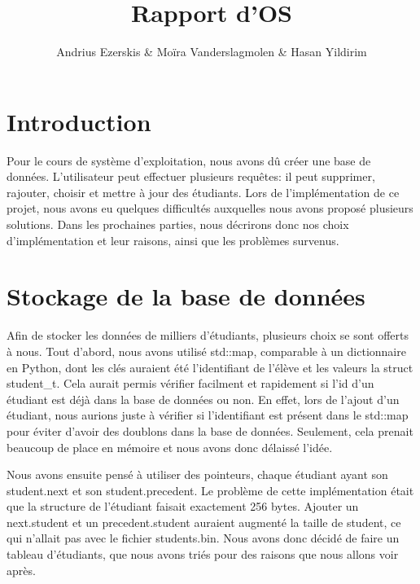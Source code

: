 \documentclass[utf8]{article}
\begin{document}
\begin{titlepage}
    

\author{Andrius Ezerskis \& Moïra Vanderslagmolen \& Hasan Yildirim}
\title{Rapport d'OS}

\maketitle
\end{titlepage}

\section{Introduction}
\par
Pour le cours de système d'exploitation, nous avons dû créer une base de données. 
L'utilisateur peut effectuer plusieurs requêtes: il peut supprimer, rajouter, choisir
et mettre à jour des étudiants. Lors de l'implémentation de ce projet, nous avons eu quelques difficultés
auxquelles nous avons proposé plusieurs solutions. Dans les prochaines parties, nous décrirons donc
nos choix d'implémentation et leur raisons, ainsi que les problèmes survenus.
\par


\section{Stockage de la base de données}
\indent{}
\par
Afin de stocker les données de milliers d'étudiants, plusieurs choix se sont offerts à nous. 
Tout d'abord, nous avons utilisé std::map, comparable à un dictionnaire en Python, dont les
clés auraient été l'identifiant de l'élève et les valeurs la struct student\_t. 
Cela aurait permis vérifier facilment et rapidement si l'id d'un étudiant est déjà dans la base de données ou non. En effet, lors de l'ajout d'un étudiant, nous aurions juste à vérifier si l'identifiant est présent dans le std::map pour éviter d'avoir des doublons dans la base de données.
Seulement, cela prenait beaucoup de place en mémoire et nous avons donc délaissé l'idée. 
\par
\indent{}
\par
Nous avons ensuite pensé à utiliser des pointeurs, chaque étudiant
ayant son student.next et son student.precedent. Le problème de cette implémentation était que la structure de l'étudiant faisait exactement 256 bytes.
Ajouter un next.student et un precedent.student auraient augmenté la taille de student, ce qui n'allait pas avec le fichier students.bin.
Nous avons donc décidé de faire un tableau d'étudiants, que nous avons triés pour des raisons que nous allons voir après.
\par
\end{document}
